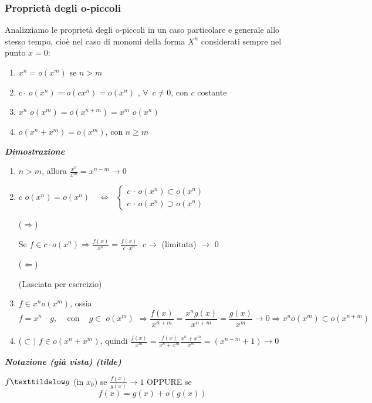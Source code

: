\documentclass{article}
\theoremstyle{definition}
\begin{document}
    \subsubsection{Proprietà degli o-piccoli}
    Analizziamo le proprietà degli o-piccoli in un caso particolare e generale allo stesso tempo, cioè nel caso di monomi della forma $X^n$ considerati sempre nel punto $x=0$:
    \begin{enumerate}
        \item $x^n=o(x^m)$ se $n > m$
        \item $c \cdot \,o(x^n)= o (cx^n)=o(x^n)$ , $\forall \,\,\, c \neq 0$, con $c$ costante
        \item $x^n \,\, o(x^m) = o(x^{n+m})=x^m \,\, o(x^n)$
        \item $o(x^n+x^m)=o(x^m)$, con $n \geqslant m$
    \end{enumerate}
    \begin{center}
        \textbf{\textit{Dimostrazione}}
    \end{center}
\begin{enumerate}
    \item $n > m$, allora $\frac{x^n}{x^m}=x^{n-m} \to 0$
    \item $c \,\, o(x^n)=o(x^n) \,\,\,\,\,\, \Longleftrightarrow \,\,\,\, \begin{cases}
        c \,\cdot\, o(x^n) \subset o(x^n) \\
        c \,\cdot\, o(x^n) \supset o(x^n)
    \end{cases}$
    \begin{center}
        ($\Longrightarrow$)
    \end{center}
    Se $f \in c \cdot o(x^n) \Longrightarrow \frac{f(x)}{x^n}=\frac{f(x)}{c \cdot x^n}\cdot c \to$ (limitata) $\to$ 0
    \begin{center}
        ($\Longleftarrow$)
    \end{center}
    (Lasciata per esercizio)
    \item $f \in x^n o(x^m)$, ossia 
    \begin{equation}
   f=x^n\,\cdot\,g, \,\,\,\,\,\,\, \mbox{con} \,\,\,\,\,\,\, g \in \,\, o(x^m) \,\, \Longrightarrow \frac{f(x)}{x^{n+m}}=\frac{x^n g(x)}{x^{n+m}}=\frac{g(x)}{x^m} \to 0 \Longrightarrow x^n o(x^m) \subset o(x^{n+m})
    \end{equation}
    \item ($\subset)$ $f \in o(x^n+x^m)$, quindi $\frac{f(x)}{x^m}=\frac{f(x)}{x^n+x^m} \frac{x^n+x^m}{x^m} =(x^{n-m}+1)\to 0$ 
\end{enumerate}
\begin{center}
    \textbf{\textit{Notazione (già vista) (tilde)}}
\end{center}
$f \texttildelow g $ (in $x_0$) se $\frac{f(x)}{g(x)} \to 1$ OPPURE se
\begin{equation}
    f(x)=g(x)+o(g(x))
\end{equation}
\end{document}
